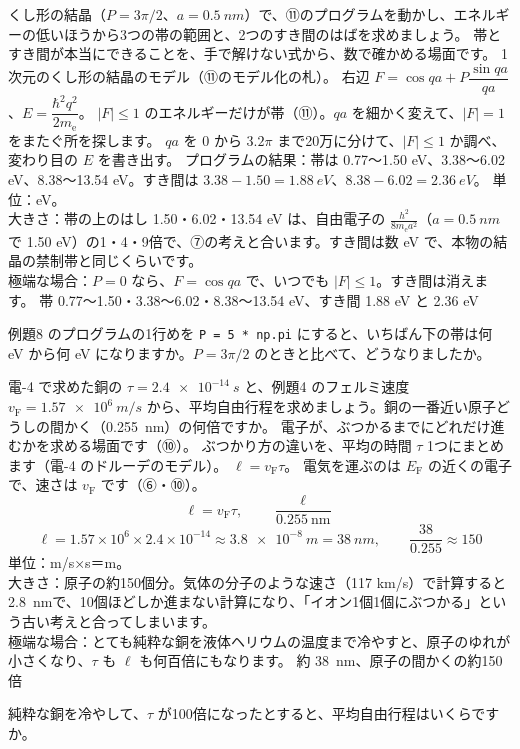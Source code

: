 \label{ph:原-8:ex8}
\begin{phreidai}
くし形の結晶（$P=3\pi/2$、$a=\qty{0.5}{nm}$）で、⑪のプログラムを動かし、エネルギーの低いほうから3つの帯の範囲と、2つのすき間のはばを求めましょう。
\phbamen
帯とすき間が本当にできることを、手で解けない式から、数で確かめる場面です。
\phmushi
1次元のくし形の結晶のモデル（⑪のモデル化の札）。
\phzu
右辺 $F=\cos qa+P\dfrac{\sin qa}{qa}$、$E=\dfrac{\hbar^2q^2}{2m_{\mathrm e}}$。
\phriyu
$|F|\le1$ のエネルギーだけが帯（⑪）。$qa$ を細かく変えて、$|F|=1$ をまたぐ所を探します。
\phtateru
$qa$ を 0 から $3.2\pi$ まで20万に分けて、$|F|\le1$ か調べ、変わり目の $E$ を書き出す。
\phtoku
プログラムの結果：帯は 0.77〜1.50 eV、3.38〜6.02 eV、8.38〜13.54 eV。すき間は $3.38-1.50=\qty{1.88}{eV}$、$8.38-6.02=\qty{2.36}{eV}$。
\phtashikame
単位：eV。\\
大きさ：帯の上のはし 1.50・6.02・13.54 eV は、自由電子の $\tfrac{h^2}{8m_{\mathrm e}a^2}$（$a=\qty{0.5}{nm}$ で 1.50 eV）の1・4・9倍で、⑦の考えと合います。すき間は数 eV で、本物の結晶の禁制帯と同じくらいです。\\
極端な場合：$P=0$ なら、$F=\cos qa$ で、いつでも $|F|\le1$。すき間は消えます。
\kotae 帯 0.77〜1.50・3.38〜6.02・8.38〜13.54 eV、すき間 1.88 eV と 2.36 eV
\end{phreidai}
\begin{jibun}
例題8 のプログラムの1行めを \texttt{P = 5 * np.pi} にすると、いちばん下の帯は何 eV から何 eV になりますか。$P=3\pi/2$ のときと比べて、どうなりましたか。
\end{jibun}

\label{ph:原-8:ex9}
\begin{phreidai}[銅の電子の平均自由行程]
電-4 で求めた銅の $\tau=\qty{2.4e-14}{s}$ と、例題4 のフェルミ速度 $v_{\mathrm F}=\qty{1.57e6}{m/s}$ から、平均自由行程を求めましょう。銅の一番近い原子どうしの間かく（\qty{0.255}{nm}）の何倍ですか。
\phbamen
電子が、ぶつかるまでにどれだけ進むかを求める場面です（⑩）。
\phmushi
ぶつかり方の違いを、平均の時間 $\tau$ 1つにまとめます（電-4 のドルーデのモデル）。
\phzu
$\ell=v_{\mathrm F}\tau$。
\phriyu
電気を運ぶのは $E_{\mathrm F}$ の近くの電子で、速さは $v_{\mathrm F}$ です（⑥・⑩）。
\phtateru
\[ \ell=v_{\mathrm F}\tau,\qquad \frac{\ell}{0.255\ \text{nm}} \]
\phtoku
\[ \ell=1.57\times10^6\times2.4\times10^{-14}\approx\qty{3.8e-8}{m}=\qty{38}{nm},\qquad \frac{38}{0.255}\approx150 \]
\phtashikame
単位：m/s×s＝m。\\
大きさ：原子の約150個分。気体の分子のような速さ（117 km/s）で計算すると \qty{2.8}{nm}で、10個ほどしか進まない計算になり、「イオン1個1個にぶつかる」という古い考えと合ってしまいます。\\
極端な場合：とても純粋な銅を液体ヘリウムの温度まで冷やすと、原子のゆれが小さくなり、$\tau$ も $\ell$ も何百倍にもなります。
\kotae 約 \qty{38}{nm}、原子の間かくの約150倍
\end{phreidai}
\begin{jibun}
純粋な銅を冷やして、$\tau$ が100倍になったとすると、平均自由行程はいくらですか。
\end{jibun}

